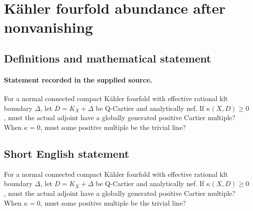 \documentclass[11pt]{article}
\begin{document}
\section*{Kähler fourfold abundance after nonvanishing}\label{30007038}
\subsection{Definitions and mathematical statement}
\paragraph{Statement recorded in the supplied source.}
For a normal connected compact Kähler fourfold with effective rational klt boundary $\Delta $, let $D=K_X+\Delta $ be Q-Cartier and analytically nef. If $\kappa (X,D)\geq 0$, must the actual adjoint have a globally generated positive Cartier multiple? When $\kappa =0$, must some positive multiple be the trivial line?
\subsection{Short English statement}
For a normal connected compact Kähler fourfold with effective rational klt boundary $\Delta $, let $D=K_X+\Delta $ be Q-Cartier and analytically nef. If $\kappa (X,D)\geq 0$, must the actual adjoint have a globally generated positive Cartier multiple? When $\kappa =0$, must some positive multiple be the trivial line?
\end{document}
